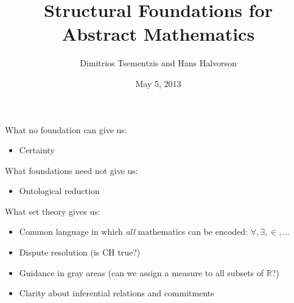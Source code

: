 \documentclass[8pt]{beamer}
\title{Structural Foundations for Abstract Mathematics}
\author{Dimitrios Tsementzis and Hans Halvorson}
\date{May 5, 2013}
\begin{document}
\def\2{\mathcal}
\def\7{\mathbb}
\begin{frame}



\maketitle


\end{frame}
\begin{frame}

\newenvironment{proenv}{\only{\setbeamercolor{local structure}{fg=green}}}{}
\newenvironment{conenv}{\only{\setbeamercolor{local structure}{fg=red}}}{}  
\newenvironment{neuenv}{\only{\setbeamercolor{local structure}{fg=yellow}}}{}


What no foundation can give us:
\begin{itemize}
\item<con@1-> Certainty
\end{itemize}

\bigskip
What foundations need not give us:
\begin{itemize}
\item<neu@1-> Ontological reduction
\end{itemize}

\bigskip
What set theory gives us:
\begin{itemize}
\item<pro@1-> Common language in which \emph{all} mathematics can be encoded:
  $\forall ,\exists ,\in,\dots$
\item<pro@1-> Dispute resolution (is CH true?)
\item<pro@1-> Guidance in gray areas (can we assign a measure to all
  subsets of $\mathbb{R}$?)
\item<pro@1-> Clarity about inferential relations and commitments
\end{itemize}
\end{frame}
\end{document}
